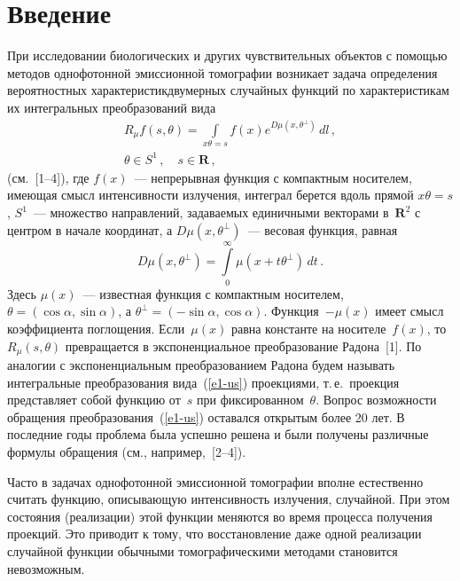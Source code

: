       \begin{multicols}{2}
      
            \label{st\stat}


\section{Введение}

При исследовании биологических и других чув\-ст\-ви\-тель\-ных объектов с помощью методов 
однофотонной эмиссионной томографии возникает задача определения вероятностных 
характеристик\linebreak двумерных случайных функций
по характеристикам их интегральных преобразований вида
\begin{multline}
R_\mu f(s,\theta)=\int\limits_{x\theta=s}f(x)e^{D\mu(x,\theta^{\perp})}\,dl\,,\\
\theta\in S^1\,,\quad s\in\mathbf{R}\,,
\label{e1-us}
\end{multline} 
(см.\ [1--4]), где $f(x)$~--- непрерывная функция
с компактным носителем, имеющая смысл интенсивности излучения,
интеграл берется вдоль прямой $x\theta=s$, $S^1$~---
множество направлений, задаваемых единичными векторами в~$\mathbf{R}^2$ 
с центром в начале координат, а
$D\mu(x,\theta^{\perp})$~--- весовая функция, равная
$$
D\mu(x,\theta^{\perp})=\int\limits_{0}^{\infty}\mu(x+t\theta^{\perp})\,dt\,.
$$
Здесь $\mu(x)$~--- известная функция с компактным носителем,
$\theta=(\cos\alpha,\sin\alpha)$, а
$\theta^{\perp}=(-\sin\alpha,\cos\alpha)$. Функция~$-\mu(x)$ имеет
смысл коэффициента поглощения. Если~$\mu(x)$ равна константе на носителе~$f(x)$, то
$R_\mu(s,\theta)$ превращается в экспоненциальное преобразование
Радона~[1]. По аналогии с экспоненциальным преобразованием Радона 
будем называть интегральные преобразования вида~(\ref{e1-us}) проекциями, 
т.\,е.\ проекция представляет собой функцию от~$s$ при фиксированном~$\theta$. 
Вопрос возможности обращения преобразования~(\ref{e1-us}) оставался открытым более
20 лет. В последние годы проблема была успешно решена и были
получены различные формулы обращения (см., например,~[2--4]).

Часто в задачах однофотонной эмиссионной томографии вполне естественно 
считать функцию, описывающую интенсивность излучения, случайной.
При этом состояния (реализации) этой функции меняются во время
процесса получения проекций. Это приводит к тому, что
восстановление даже одной реализации случайной функции обычными
томографическими методами становится невозможным.


\end{multicols}
